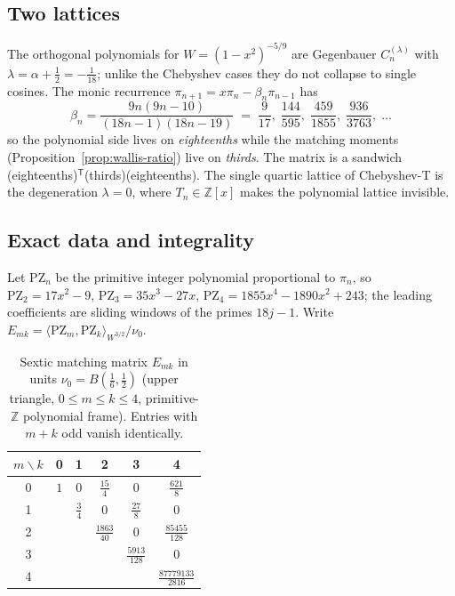 \documentclass[11pt,a4paper]{article}
\newcommand{\Z}{\mathbb{Z}}
\begin{document}
\subsection{Two lattices}

The orthogonal polynomials for $W=(1-x^2)^{-5/9}$ are Gegenbauer
$C_n^{(\lambda)}$ with $\lambda=\alpha+\tfrac12=-\tfrac1{18}$; unlike the
Chebyshev cases they do not collapse to single cosines.  The monic
recurrence $\pi_{n+1}=x\pi_n-\beta_n\pi_{n-1}$ has
\[
  \beta_n=\frac{9n(9n-10)}{(18n-1)(18n-19)}
  \;=\;\frac{9}{17},\;\frac{144}{595},\;\frac{459}{1855},\;
  \frac{936}{3763},\;\ldots
\]
so the polynomial side lives on \emph{eighteenths} while the matching
moments (Proposition~\ref{prop:wallis-ratio}) live on \emph{thirds}.  The
matrix is a sandwich (eighteenths)$^{\mathsf T}$(thirds)(eighteenths).
The single quartic lattice of Chebyshev-T is the degeneration $\lambda=0$,
where $T_n\in\Z[x]$ makes the polynomial lattice invisible.

\subsection{Exact data and integrality}

Let $\mathrm{PZ}_n$ be the primitive integer polynomial proportional to
$\pi_n$, so $\mathrm{PZ}_2=17x^2-9$, $\mathrm{PZ}_3=35x^3-27x$,
$\mathrm{PZ}_4=1855x^4-1890x^2+243$; the leading coefficients are sliding
windows of the primes $18j-1$.  Write
$E_{mk}=\langle \mathrm{PZ}_m,\mathrm{PZ}_k\rangle_{W^{3/2}}/\nu_0$.

\begin{table}[ht]
\centering
\caption{Sextic matching matrix $E_{mk}$ in units $\nu_0=B(\tfrac16,\tfrac12)$
(upper triangle, $0\le m\le k\le 4$, primitive-$\Z$ polynomial frame).
Entries with $m+k$ odd vanish identically.}
\label{tab:sextic}
\begin{tabular}{@{}c|ccccc@{}}
\toprule
$m\backslash k$ & 0 & 1 & 2 & 3 & 4 \\
\midrule
0 & $1$ & $0$ & $\frac{15}{4}$ & $0$ & $\frac{621}{8}$ \\[3pt]
1 &  & $\frac34$ & $0$ & $\frac{27}{8}$ & $0$ \\[3pt]
2 &  &  & $\frac{1863}{40}$ & $0$ & $\frac{85455}{128}$ \\[3pt]
3 &  &  &  & $\frac{5913}{128}$ & $0$ \\[3pt]
4 &  &  &  &  & $\frac{87779133}{2816}$ \\
\bottomrule
\end{tabular}
\end{table}
\end{document}
